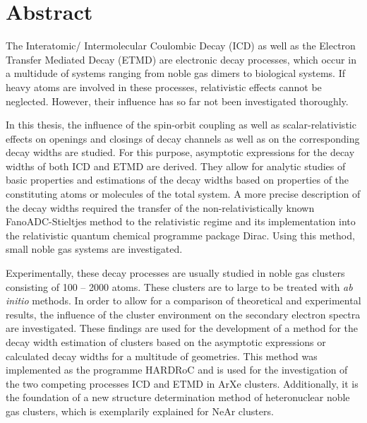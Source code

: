 \chapter*{Abstract}
\thispagestyle{empty}
The Interatomic/ Intermolecular Coulombic Decay (ICD) as well as the
Electron Transfer Mediated Decay (ETMD) are electronic decay
processes, which occur in a multidude of systems ranging from
noble gas dimers to biological systems.
If heavy atoms are involved in these processes, relativistic effects
cannot be neglected. However, their influence has so far not
been investigated thoroughly.

In this thesis, the influence of the spin-orbit coupling as well as
scalar-relativistic effects on openings and closings of decay channels as well
as on the corresponding decay widths are studied.
For this purpose, asymptotic expressions for the decay widths of both
ICD and ETMD are derived. They allow for analytic studies of basic
properties and estimations of the decay widths based on properties
of the constituting atoms or molecules of the total system.
A more precise description of the decay widths required the transfer of
the non-relativistically known FanoADC-Stieltjes method to the relativistic
regime and its implementation into the relativistic quantum chemical
programme package Dirac. Using this method, small noble gas systems
are investigated. 

Experimentally, these decay processes are usually studied in noble gas
clusters consisting of 100 -- 2000 atoms. These clusters are to
large to be treated with \emph{ab initio} methods. In order to allow
for a comparison of theoretical and experimental results, the influence
of the cluster environment on the secondary electron spectra are
investigated. These findings are used for the development of a method
for the decay width estimation of clusters based on the asymptotic
expressions or calculated decay widths for a multitude of geometries.
This method was implemented as the programme HARDRoC and
is used for the investigation of the two competing processes ICD and ETMD in
ArXe clusters. Additionally, it is the foundation of a new
structure determination method of heteronuclear noble gas clusters,
which is exemplarily explained for NeAr clusters.
